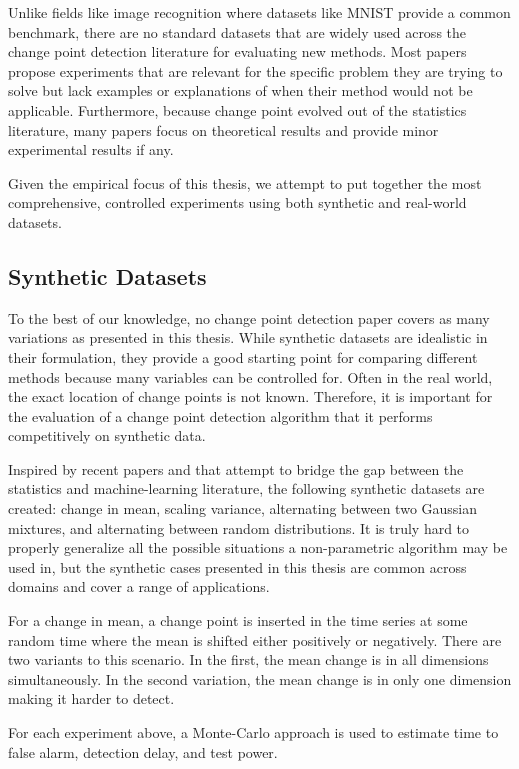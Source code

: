 Unlike fields like image recognition where datasets like MNIST provide a common benchmark, there are no standard datasets that are widely used across the change point detection literature for evaluating new methods. Most papers propose experiments that are relevant for the specific problem they are trying to solve  but lack examples or explanations of when their method would not be applicable.  Furthermore, because change point evolved out of the statistics literature, many papers focus on theoretical results and provide minor experimental results if any.

Given the empirical focus of this thesis, we attempt to put together the most comprehensive, controlled experiments using both synthetic and real-world datasets.
\subsection{Synthetic Datasets}
To the best of our knowledge, no change point detection paper covers as many variations as presented in this thesis. While synthetic datasets are idealistic in their formulation, they provide a good starting point for comparing different methods because many variables can be controlled for. Often in the real world, the exact location of change points is not known. Therefore, it is important for the evaluation of a change point detection algorithm that it performs competitively on synthetic data.

Inspired by recent papers \cite{chang2019kernel} and \cite{flynn2019change} that attempt to bridge the gap between the statistics and machine-learning literature, the following synthetic datasets are created: change in mean, scaling variance, alternating between two Gaussian mixtures, and alternating between random distributions. It is truly hard to properly generalize all the possible situations a non-parametric algorithm may be used in, but the synthetic cases presented in this thesis are common across domains and cover a range of applications.

For a change in mean, a change point is inserted in the time series at some random time where the mean is shifted either positively or negatively. There are two variants to this scenario. In the first, the mean change is in all dimensions simultaneously. In the second variation, the mean change is in only one dimension making it harder to detect. 

For each experiment above, a Monte-Carlo approach is used to estimate time to false alarm, detection delay, and test power. 

